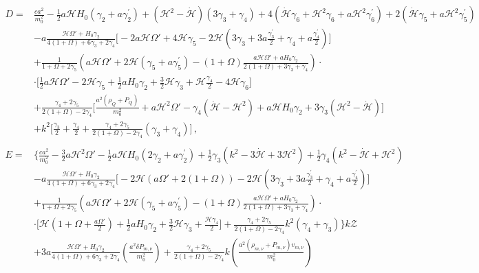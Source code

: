 \documentclass[prd,nofootinbib,showpacs]{revtex4}
\def\l{\left}
\def\r{\right}
\def\f{\frac}
\def\hub{{\mathcal H}}
\begin{document}
{\begin{align}
%
& \nonumber \\
%
D =& \f{ca^2}{m_0^2}-\f{1}{2}a\hub H_0\l( \gamma_2+a\gamma_2^\prime\r) +\l(\hub^2-\dot{\hub}\r)\l(3\gamma_3+\gamma_4\r) +4\l( \dot{\hub}\gamma_6+\hub^2\gamma_6 +a\hub^2\gamma_6^\prime\r) +2\l(\dot{\hub}\gamma_5+a\hub^2\gamma_5^\prime \r) \nonumber\\
& -a\f{\hub \Omega' + H_0\gamma_2}{4(1+\Omega)+6\gamma_3+2\gamma_4}\bigg[ -2a\hub\Omega' +4\hub\gamma_5 -2\hub\l(3\gamma_3+3a\f{\gamma_3^\prime}{2}+ \gamma_4 +a\f{\gamma_4^\prime}{2} \r)\bigg] \nonumber\\
& +\f{1}{1+\Omega+2\gamma_5}\l( a\hub\Omega' +2\hub\l(\gamma_5+a\gamma_5^\prime\r) -(1+\Omega)\f{a\hub\Omega' +aH_0\gamma_2}{2(1+\Omega) +3\gamma_3+\gamma_4}\r)\cdot \nonumber\\
& \cdot \bigg[ \f{1}{2}a\hub \Omega' -2\hub\gamma_5+\f{1}{2}aH_0 \gamma_2+\f{3}{2}\hub \gamma_3 +\hub\f{\gamma_4}{2} -4\hub \gamma_6 \bigg] \nonumber \\
& +\f{\gamma_4 +2\gamma_5}{2(1+\Omega) -2\gamma_4}\bigg[\f{a^2\l(\rho_Q+ P_Q \r)}{m_0^2} +a\hub^2\Omega' -\gamma_4\l(\dot{\hub}-\hub^2\r) +a\hub H_0\gamma_2+3\gamma_3\l(\hub^2 -\dot{\hub} \r)\bigg] \nonumber \\
& +k^2\bigg[\f{\gamma_3}{2} +\f{\gamma_4}{2} +\f{\gamma_4 +2\gamma_5}{2(1+\Omega)-2\gamma_4}\l(\gamma_3+\gamma_4 \r) \bigg] \, ,\nonumber \\
%
& \nonumber \\
%
E =& \bigg\{ \f{ca^2}{m_0^2} -\f{3}{2}a\hub^2\Omega' -\f{1}{2}a\hub H_0\l(2\gamma_2+a\gamma_2^\prime\r) +\f{1}{2}\gamma_3\l(k^2 -3\dot{\hub} + 3\hub^2\r) +\f{1}{2}\gamma_4\l(k^2 -\dot{\hub} +\hub^2 \r) \nonumber \\
& -a\f{\hub \Omega' + H_0\gamma_2}{4(1+\Omega)+6\gamma_3+2\gamma_4}\bigg[ -2\hub\l(a\Omega' +2(1+\Omega)\r) -2\hub\l(3\gamma_3 +3 a\f{\gamma_3^\prime}{2} +\gamma_4 +a\f{\gamma_4^\prime}{2}\r) \bigg] \nonumber \\
& +\f{1}{1+\Omega+2\gamma_5}\l( a\hub\Omega' +2\hub\l(\gamma_5+a\gamma_5^\prime\r) -(1+\Omega)\f{a\hub\Omega' +aH_0\gamma_2}{2(1+\Omega) +3\gamma_3+\gamma_4}\r)\cdot \nonumber\\
&\cdot \bigg[ \hub\l(1+\Omega +\f{a\Omega'}{2}\r) +\f{1}{2}aH_0\gamma_2+\f{3}{2}\hub\gamma_3+\f{\hub\gamma_4}{2} \bigg] +\f{\gamma_4 +2\gamma_5}{2(1+\Omega) -2\gamma_4}k^2\l(\gamma_4 +\gamma_3\r) \bigg\} k\mathcal{Z} \nonumber \\
& +3a\f{\hub \Omega' + H_0\gamma_2}{4(1+\Omega)+6\gamma_3 +2\gamma_4}	\l(\f{a^2 \delta P_{m,\nu}}{m_0^2} \r) +\f{\gamma_4 +2\gamma_5}{2(1+\Omega) -2\gamma_4}k\l(\f{a^2\l(\rho_{m,\nu} +P_{m,\nu} \r)v_{m,\nu}}{m_0^2} \r) \nonumber \\

\end{align}}
\end{document}
